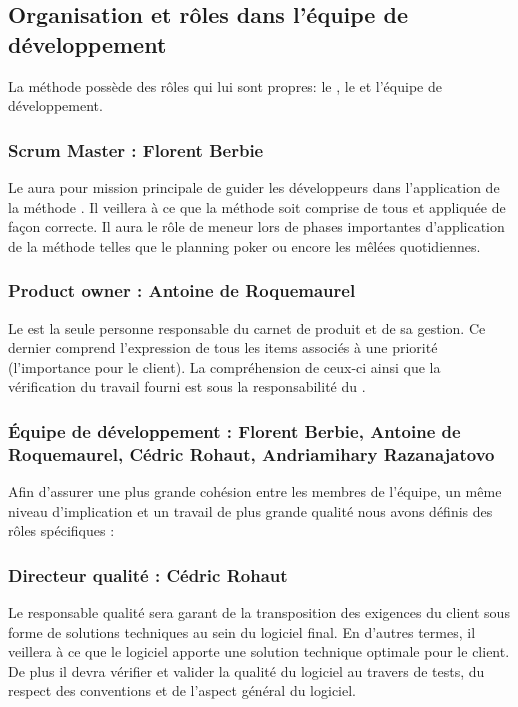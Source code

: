 \subsection{Organisation et rôles dans l'équipe de développement}
La méthode  possède des rôles qui lui sont propres: le , le  et l'équipe de développement. 

\subsubsection{Scrum Master : Florent Berbie}
Le  aura pour mission principale de guider les développeurs dans l'application de la méthode . Il veillera à ce que la méthode soit
comprise de tous et appliquée de façon correcte. Il aura le rôle de meneur lors de phases importantes d’application de la méthode telles que le
planning poker ou encore les mêlées quotidiennes.
\subsubsection{Product owner : Antoine de Roquemaurel}
Le  est la seule personne responsable du carnet de produit et de sa gestion. Ce dernier comprend l’expression de tous les items associés
à une priorité (l'importance pour le client). La compréhension de ceux-ci ainsi que la vérification du travail fourni est sous la responsabilité du
.
\subsubsection{Équipe de développement : Florent Berbie, Antoine de Roquemaurel, Cédric Rohaut, Andriamihary Razanajatovo}
Afin d’assurer une plus grande cohésion entre les membres de l’équipe, un même niveau d’implication et un travail de plus grande qualité nous avons
définis des rôles spécifiques : 
\subsubsection{Directeur qualité : Cédric Rohaut}
Le responsable qualité sera garant de la transposition des exigences du client sous forme de solutions techniques au sein du logiciel final. En
d’autres termes, il veillera à ce que le logiciel apporte une solution technique optimale pour le client. De plus il devra vérifier et valider la
qualité du logiciel au travers de tests, du respect des conventions et de l'aspect général du logiciel.

